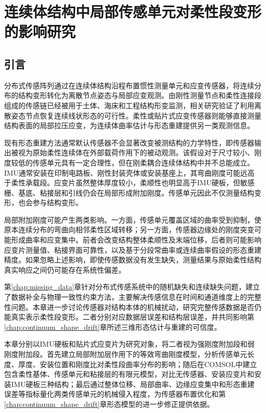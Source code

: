 \chapter{连续体结构中局部传感单元对柔性段变形的影响研究}
\label{chap:sensor_mechanical_influence}

\section{引言}
\label{sec:sensor_influence_intro}

分布式传感阵列通过在连续体结构沿程布置惯性测量单元和应变传感器，将连续分布的结构变形转化为离散节点姿态与局部应变观测。由刚性测量节点和柔性连接段组成的传感链已经被用于土体、海床和工程结构形变监测，相关研究验证了利用离散姿态节点恢复连续线状形态的可行性\cite{griffith2010shapeaccelarray,cao2022longterm}。柔性或贴片式应变传感器则能够直接测量结构表面的局部拉压应变，为连续体曲率估计与形态重建提供另一类观测信息\cite{liu2025modelbased,shen2024shape}。

现有形态重建方法通常默认传感器不会显著改变被测结构的力学特性，即传感器输出被视为原始柔性连续体在外部载荷作用下的被动观测。该假设对于尺寸较小、刚度较低的传感单元具有一定合理性，但在刚柔耦合连续体结构中并不总能成立。IMU通常安装在印制电路板、刚性封装壳体或安装基座上，其弯曲刚度可能远高于柔性承载段。应变片虽然整体厚度较小，柔顺性也明显高于IMU硬板，但敏感栅、基底、粘接层和引线仍会在局部形成附加刚度。传感单元因此不仅测量结构变形，也会参与结构变形。

局部附加刚度可能产生两类影响。一方面，传感单元覆盖区域的曲率受到抑制，使原本连续分布的弯曲向相邻柔性区域转移；另一方面，传感器边缘处的刚度突变可能形成曲率和应变集中。前者会改变结构整体柔顺性及末端位移，后者则可能影响应变片测量值、粘接界面可靠性，以及基于分段常曲率或连续曲率假设的形态重建精度。如果忽略上述影响，即使传感数据没有发生缺失，测量结果与原始柔性结构真实响应之间仍可能存在系统性偏差。

第\ref{chap:missing_data}章针对分布式传感系统中的随机缺失和连续缺失问题，建立了数据补全与物理一致性约束方法，主要解决传感信息在时间和通道维度上的完整性问题。本章进一步讨论传感器对结构本体的机械扰动，研究完整传感数据是否仍能真实表示柔性段变形。二者分别对应数据层误差和结构层误差，并共同影响第\ref{chap:continuum_shape_drift}章所述三维形态估计与重建的可信度。

本章分别以IMU硬板和贴片式应变片为研究对象，将二者视为强刚度附加段和弱刚度附加段。首先建立局部附加层作用下的等效弯曲刚度模型，分析传感单元长度、厚度、安装位置和刚度比对柔性段曲率分布的影响；随后在COMSOL中建立包含柔性基体、传感单元和粘接层的有限元模型，对比无传感器、安装应变片和安装IMU硬板三种结构；最后通过整体位移、局部曲率、边缘应变集中和形态重建误差等指标量化两类传感单元的机械侵入程度，为传感器布置优化和第\ref{chap:continuum_shape_drift}章形态模型的进一步修正提供依据。


